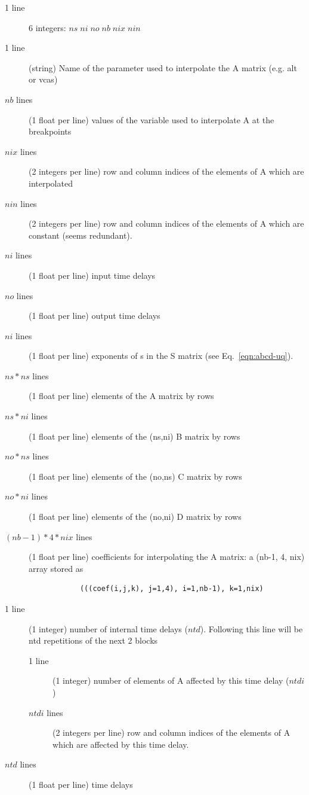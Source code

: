 \documentclass[11pt,openany,twoside]{book}
\numberwithin{equation}{section}		%
\newcommand{\Eqn}[1]{Eq.\ \ref{#1}}  %
\begin{document}
\begin{description}
	\item[1 line] 6 integers: $ns\; ni\; no\; nb\; nix\; nin$
	\item[1 line] (string) Name of the parameter used to interpolate the
		A matrix (e.g. alt or vcas)
	\item[$nb$ lines] (1 float per line) values of the variable used
                to interpolate A at the breakpoints
	\item[$nix$ lines] (2 integers per line) row and column indices of the elements
                of A which are interpolated
	\item[$nin$ lines] (2 integers per line) row and column indices of the elements
                of A which are constant (seems redundant).
	\item[$ni$ lines] (1 float per line) input time delays
	\item[$no$ lines] (1 float per line) output time delays
	\item[$ni$ lines] (1 float per line) exponents of s in the S matrix
                (see \Eqn{eqn:abcd-uq}).
   \item[$ns*ns$ lines] (1 float per line) elements of the A matrix by rows
	\item[$ns*ni$ lines] (1 float per line) elements of the (ns,ni) B matrix by rows
   \item[$no*ns$ lines] (1 float per line) elements of the (no,ns) C matrix by rows
	\item[$no*ni$ lines] (1 float per line) elements of the (no,ni) D matrix by rows
	\item[$(nb-1)*4*nix$ lines] (1 float per line) coefficients for interpolating
                the A matrix: a (nb-1, 4, nix) array stored as
			\nopagebreak
			{\scriptsize \ttfamily
			\begin{verbatim}
			(((coef(i,j,k), j=1,4), i=1,nb-1), k=1,nix)
			\end{verbatim}
			}
			\nopagebreak
	\item[1 line] (1 integer) number of internal time delays ($ntd$). Following
				this line will be ntd repetitions of the next 2 blocks
	\begin{description}
		\item[1 line] (1 integer) number of elements of A affected by this
				time delay ($ntdi$)
		\item[$ntdi$ lines] (2 integers per line) row and column indices of the elements
                of A which are affected by this time delay.
	\end{description}
	\item[$ntd$ lines] (1 float per line) time delays
\end{description}
\end{document}
